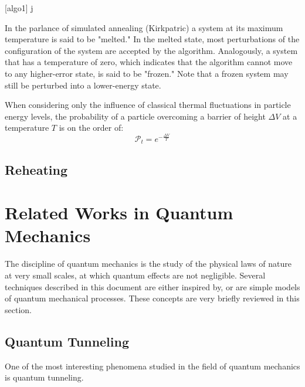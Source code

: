 \documentclass[11pt]{afthesis}
\begin{document}
[algo1]
j

In the parlance of simulated annealing (Kirkpatric) a system at its maximum temperature is said to be "melted." In the melted state, most perturbations of the configuration of the system are accepted by the algorithm. Analogously, a system that has a temperature of zero, which indicates that the algorithm cannot move to any higher-error state, is said to be "frozen." Note that a frozen system may still be perturbed into a lower-energy state.

When considering only the influence of classical thermal fluctuations in particle energy levels, the probability of a particle overcoming a barrier of height \begin{math} \Delta V \end{math} at a temperature \begin{math} T \end{math} is on the order of: \begin{equation} 
\mathcal{P}_t = e^{-\frac{\Delta V}{T}} 
\end{equation}

\subsection{Reheating}


\section{Related Works in Quantum Mechanics}


The discipline of quantum mechanics is the study of the physical laws of nature at very small scales, at which quantum effects are not negligible. Several techniques described in this document are either inspired by, or are simple models of quantum mechanical processes. These concepts are very briefly reviewed in this section. 

\subsection{Quantum Tunneling} 



One of the most interesting phenomena studied in the field of quantum mechanics is quantum tunneling. 
\end{document}

